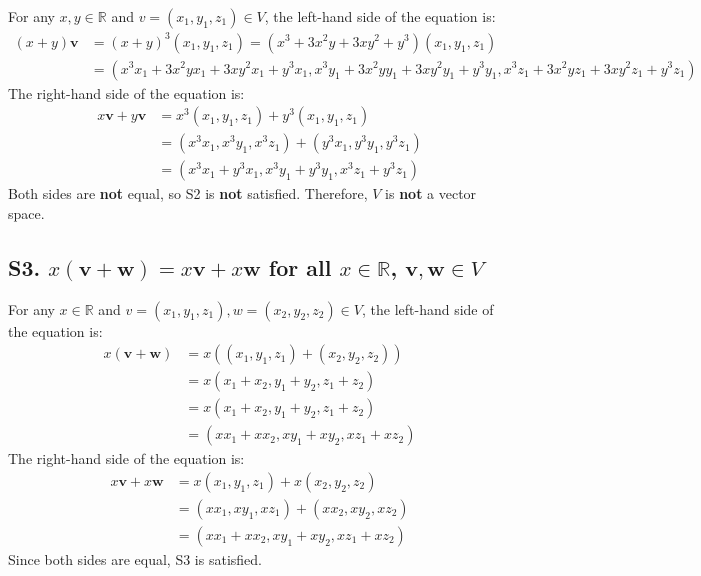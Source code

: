 \documentclass[
  letterpaper,
  DIV=11,
  numbers=noendperiod]{scrartcl}
\begin{document}
For any \(x, y \in \mathbb{R}\) and \(v = (x_1, y_1, z_1) \in V\), the
left-hand side of the equation is: \begin{align*}
(x+y)\mathbf{v} &= (x+y)^3(x_1, y_1, z_1) = (x^3+3x^2y+3xy^2+y^3)(x_1, y_1, z_1) \\
&= (x^3x_1+3x^2yx_1+3xy^2x_1+y^3x_1, x^3y_1+3x^2yy_1+3xy^2y_1+y^3y_1, x^3z_1+3x^2yz_1+3xy^2z_1+y^3z_1)
\end{align*} The right-hand side of the equation is: \begin{align*}
x\mathbf{v} + y\mathbf{v} &= x^3(x_1, y_1, z_1) + y^3(x_1, y_1, z_1) \\
&= (x^3x_1, x^3y_1, x^3z_1) + (y^3x_1, y^3y_1, y^3z_1) \\
&= (x^3x_1+y^3x_1, x^3y_1+y^3y_1, x^3z_1+y^3z_1)
\end{align*} Both sides are \textbf{not} equal, so S2 is \textbf{not}
satisfied. Therefore, \(V\) is \textbf{not} a vector space.

\subsection{\texorpdfstring{S3.
\(x(\mathbf{v+w}) = x\mathbf{v} + x\mathbf{w}\) for all
\(x \in \mathbb{R}\),
\(\mathbf{v,w} \in V\)}{S3. x(\textbackslash mathbf\{v+w\}) = x\textbackslash mathbf\{v\} + x\textbackslash mathbf\{w\} for all x \textbackslash in \textbackslash mathbb\{R\}, \textbackslash mathbf\{v,w\} \textbackslash in V}}\label{s3.-xmathbfvw-xmathbfv-xmathbfw-for-all-x-in-mathbbr-mathbfvw-in-v}

For any \(x \in \mathbb{R}\) and
\(v = (x_1, y_1, z_1), w = (x_2, y_2, z_2) \in V\), the left-hand side
of the equation is: \begin{align*}
x(\mathbf{v+w}) &= x((x_1, y_1, z_1) + (x_2, y_2, z_2)) \\
&= x(x_1+x_2, y_1+y_2, z_1+z_2) \\
&= x(x_1+x_2, y_1+y_2, z_1+z_2) \\
&= (xx_1+xx_2, xy_1+xy_2, xz_1+xz_2)
\end{align*} The right-hand side of the equation is: \begin{align*}
x\mathbf{v} + x\mathbf{w} &= x(x_1, y_1, z_1) + x(x_2, y_2, z_2) \\
&= (xx_1, xy_1, xz_1) + (xx_2, xy_2, xz_2) \\
&= (xx_1+xx_2, xy_1+xy_2, xz_1+xz_2)
\end{align*} Since both sides are equal, S3 is satisfied.
\end{document}
